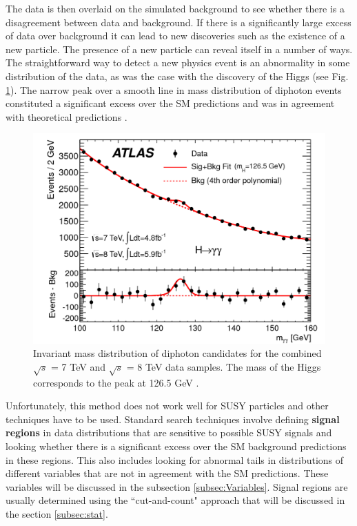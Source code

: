 The data is then overlaid on the simulated background to see whether there is a disagreement between data and background. If there is a significantly large excess of data over background it can lead to new discoveries such as the existence of a new particle.  The presence of a new particle can reveal itself in a number of ways. The straightforward way to detect a new physics event is an abnormality in some distribution of the data, as was the case with the discovery of the Higgs (see Fig. \ref{Higgs}). The narrow peak over a smooth line in mass distribution of diphoton events constituted a significant excess over the SM predictions and was in agreement with theoretical predictions \citep{Aad:2012tfa}. 

\begin{figure}[!h]
	\centering
	\captionsetup{width=0.8\textwidth}
	\includegraphics[scale=0.2]{Chap3/figaux_004a}
	\caption[Invariant mass of diphoton events: discovery of the Higgs]{Invariant mass distribution of diphoton 				candidates for the combined $\sqrt{s}$ = 7 TeV and $\sqrt{s}$ = 8 TeV 			data samples. The mass of the Higgs corresponds to the peak at 126.5 				GeV \citep{Aad:2012tfa}.}
	\label{Higgs}
\end{figure}

Unfortunately, this method does not work well for SUSY particles and other techniques have to be used. Standard search techniques involve defining \textbf{signal regions} in data distributions that are sensitive to possible SUSY signals and looking whether there is a significant excess over the SM background predictions in these regions. 
This also includes looking for abnormal tails in distributions of different variables that are not in agreement with the SM predictions. These variables will be discussed in the subsection \ref{subsec:Variables}. Signal regions are usually determined using the ``cut-and-count" approach that will be discussed in the section \ref{subsec:stat}.

